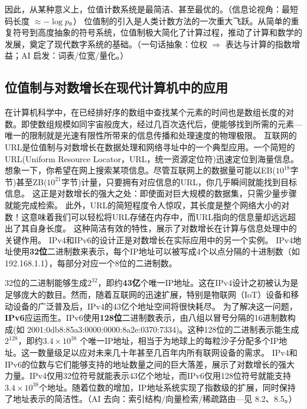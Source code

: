 因此，从某种意义上，位值计数系统是最简洁、甚至最优的。{（信息论视角：最短码长度 $\approx -\log p$。）}
位值制的引入是人类计数方法的一次重大飞跃。从简单的重复符号到高度抽象的符号系统，位值制极大简化了计算过程，推动了计算和数学的发展，奠定了现代数字系统的基础。{（一句话抽象：位权 $\Rightarrow$ 表达与计算的指数增益；AI 启发：词表/位宽/量化。）}

\subsection{位值制与对数增长在现代计算机中的应用}

在计算机科学中，在已经排好序的数组中查找某个元素的时间也是数组长度的对数。即使数组规模如同宇宙般庞大，经过几百次迭代后，便能够找到所需的元素---唯一的限制就是光速有限性所带来的信息传播和处理速度的物理极限。
互联网的URL是位值制与对数增长在数据处理和网络寻址中的一个典型应用。一个简短的URL(Uniform Resource Locator，URL，统一资源定位符)迅速定位到海量信息。
想象一下，你希望在网上搜索某项信息。尽管互联网上的数据量可能以EB($10^{18}$字节)甚至ZB($10^{21}$字节)计量，只要拥有对应信息的URL，你几乎瞬间就能找到目标信息。
这正是对数增长的强大之处：即使面对巨大规模的数据集，只需少量步骤就能完成检索。
此外，URL的简短程度令人惊叹，其长度是整个网络大小的对数！这意味着我们可以轻松将URL存储在内存中，而URL指向的信息量却远远超出了其自身长度。
这种简洁有效的特性，展示了对数增长在计算与信息处理中的关键作用。
IPv4和IPv6的设计正是对数增长在实际应用中的另一个实例。
 IPv4地址使用{\bf 32位}二进制数来表示，每个IP地址可以被写成4个以点分隔的十进制数（如192.168.1.1），每部分对应一个8位的二进制数。

32位的二进制能够生成$2^{32}$，即约{\bf 43亿}个唯一IP地址。这在IPv4设计之初被认为是足够庞大的数目。然而，随着互联网的迅速扩展，特别是物联网（IoT）设备和移动设备的广泛普及后，IPv4的43亿个地址空间将很快耗尽。
   为了解决这一问题，{\bf IPv6}应运而生。IPv6使用{\bf 128位}二进制数表示，由八组以冒号分隔的16进制数构成(如 2001:0db8:85a3:0000:0000:8a2e:0370:7334)。这种128位的二进制表示能生成$2^{128}$，即约{\bf $3.4 \times 10^{38} $} 个唯一IP地址，相当于为地球上的每粒沙子分配多个IP地址。这一数量级足以应对未来几十年甚至几百年内所有联网设备的需求。
IPv4和IPv6的位数与它们能够支持的地址数量之间的巨大落差，展示了对数增长的强大力量。IPv4仅用32位符号就能表示43亿个地址，而IPv6仅用128位符号就能支持{\bf $3.4 \times 10^{38}$}个地址。随着位数的增加，IP地址系统实现了指数级的扩展，同时保持了地址表示的简洁性。{（AI 去向：索引结构/向量检索/稀疏路由—见 8.2、8.5。）}

